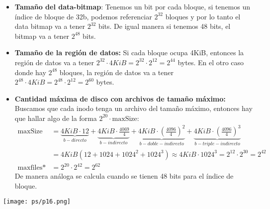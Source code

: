 \documentclass[openany]{book}
\begin{document}
\begin{rta}
    \begin{itemize}
        \item \textbf{Tamaño del data-bitmap}: Tenemos un bit por cada bloque, si tenemos un índice de bloque de 32b, podemos referenciar $2^{32}$ bloques y por lo tanto el data bitmap va a tener $2^{32}$ bits. De igual manera si tenemos 48 bits, el bitmap va a tener $2^{48}$ bits.
        \item \textbf{Tamaño de la región de datos:} Si cada bloque ocupa 4KiB, entonces la región de datos va a tener $2^{32} \cdot 4KiB = 2^{32} \cdot 2^{12} = 2^{44}$ bytes. En el otro caso donde hay $2^{48}$ bloques, la región de datos va a tener $2^{48} \cdot 4KiB = 2^{48} \cdot 2^{12} = 2^{60}$ bytes.
        \item \textbf{Cantidad máxima de disco con archivos de tamaño máximo:} Buscamos que cada inodo tenga un archivo del tamaño máximo, entonces hay que hallar algo de la forma $2^{20} \cdot \text{maxSize}$:
        \begin{align*}
            \text{maxSize} &= \underbrace{4KiB \cdot 12}_{b-directo} + \underbrace{4KiB \cdot \frac{4069}{4}}_{b-indirecto} + \underbrace{4KiB \cdot \left( \frac{4096}{4} \right)^2}_{b-doble-indirecto} + \underbrace{4KiB \cdot \left( \frac{4096}{4} \right)^3}_{b-triple-indirecto} \\
                           &= 4KiB (12 + 1024 + 1024^2 + 1024^3) \approx 4KiB \cdot 1024^3 = 2^12 \cdot 2^{30} = 2^{42} \\
            \text{maxfiles*} &= 2^{20} \cdot 2^{42} = 2^{62}             
        \end{align*}
        De manera análoga se calcula cuando se tienen 48 bits para el índice de bloque.
    \end{itemize}
\end{rta}

\texttt{[image: ps/p16.png]}
\end{document}
